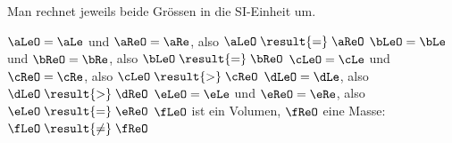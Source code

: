 Man rechnet jeweils beide Grössen in die SI-Einheit um.
\begin{abcliste}
\abc $\aLeO = \aLe$ und $\aReO = \aRe$, also $\aLeO \;\result{=}\; \aReO$
\abc $\bLeO = \bLe$ und $\bReO = \bRe$, also $\bLeO \;\result{=}\; \bReO$
\abc $\cLeO = \cLe$ und $\cReO = \cRe$, also $\cLeO \;\result{>}\; \cReO$
\abc $\dLeO = \dLe$, also $\dLeO \;\result{>}\; \dReO$
\abc $\eLeO = \eLe$ und $\eReO = \eRe$, also $\eLeO \;\result{=}\; \eReO$
\abc $\fLeO$ ist ein Volumen, $\fReO$ eine Masse: $\fLeO \;\result{\neq}\; \fReO$
\end{abcliste}
